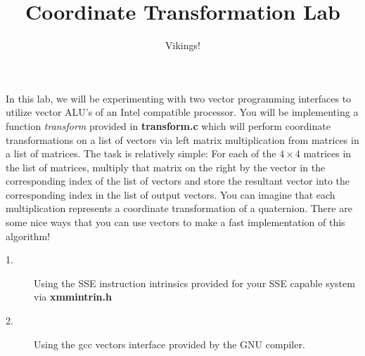 \documentclass[12pt]{article}
\title{Coordinate Transformation Lab}
\author{Vikings!}
\begin{document}
\maketitle

\par In this lab, we will be experimenting with two vector programming interfaces to utilize vector ALU's of an Intel compatible processor.
You will be implementing a function \textit{transform} provided in \textbf{transform.c} which will perform coordinate transformations on a list of vectors via left matrix multiplication from matrices in a list of matrices.
The task is relatively simple: For each of the $4 \times 4$ matrices in the list of matrices, multiply that matrix on the right by the vector in the corresponding index of the list of vectors and store the resultant vector into the corresponding index in the list of output vectors.
You can imagine that each multiplication represents a coordinate transformation of a quaternion.
There are some nice ways that you can use vectors to make a fast implementation of this algorithm!

\begin{description}
\item[1.] Using the SSE instruction intrinsics provided for your SSE capable system via \textbf{xmmintrin.h}
\item[2.] Using the gcc vectors interface provided by the GNU compiler.
\end{description}
\end{document}
